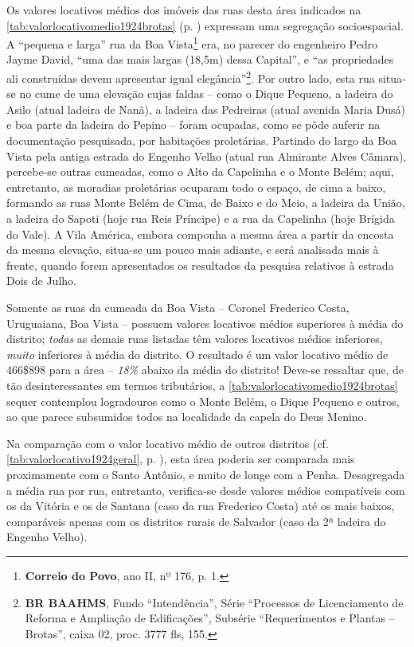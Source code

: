 Os valores locativos médios dos imóveis das ruas desta área indicados na \autoref{tab:valorlocativomedio1924brotas} (p. \pageref{tab:valorlocativomedio1924brotas}) expressam uma segregação socioespacial. A ``pequena e larga'' rua da Boa Vista\footnote{\textbf{Correio do Povo}, ano II, nº 176, p. 1.} era, no parecer do engenheiro Pedro Jayme David, ``uma das mais largas (18,5m) dessa Capital'', e ``as propriedades ali construídas devem apresentar igual elegância''\footnote{\textbf{BR BAAHMS}, Fundo ``Intendência'', Série ``Processos de Licenciamento de Reforma e Ampliação de Edificações'', Subsérie ``Requerimentos e Plantas -- Brotas'', caixa 02, proc. 3777 fls, 155.}. Por outro lado, esta rua situa-se no cume de uma elevação cujas faldas -- como o Dique Pequeno, a ladeira do Asilo (atual ladeira de Nanã), a ladeira das Pedreiras (atual avenida Maria Dusá) e boa parte da ladeira do Pepino --  foram ocupadas, como se pôde auferir na documentação pesquisada, por habitações proletárias. Partindo do largo da Boa Vista pela antiga estrada do Engenho Velho (atual rua Almirante Alves Câmara), percebe-se outras cumeadas, como o Alto da Capelinha e o Monte Belém; aqui, entretanto, as moradias proletárias ocuparam todo o espaço, de cima a baixo, formando as ruas Monte Belém de Cima, de Baixo e do Meio, a ladeira da União, a ladeira do Sapoti (hoje rua Reis Príncipe) e a rua da Capelinha (hoje Brígida do Vale). A Vila América, embora componha a mesma área a partir da encosta da mesma elevação, situa-se um pouco mais adiante, e será analisada mais à frente, quando forem apresentados os resultados da pesquisa relativos à estrada Dois de Julho. 

Somente as ruas da cumeada da Boa Vista -- Coronel Frederico Costa, Uruguaiana, Boa Vista -- possuem valores locativos médios superiores à média do distrito; \textit{todas} as demais ruas listadas têm valores locativos médios inferiores, \textit{muito} inferiores à média do distrito. O resultado é um valor locativo médio de 466\$898 para a área -- \textit{18\%} abaixo da média do distrito! Deve-se ressaltar que, de tão desinteressantes em termos tributários, a \autoref{tab:valorlocativomedio1924brotas} sequer contemplou logradouros como o Monte Belém, o Dique Pequeno e outros, ao que parece subsumidos todos na localidade da capela do Deus Menino.

Na comparação com o valor locativo médio de outros distritos (cf. \autoref{tab:valorlocativo1924geral}, p. \pageref{tab:valorlocativo1924geral}), esta área poderia ser comparada mais proximamente com o Santo Antônio, e muito de longe com a Penha. Desagregada a média rua por rua, entretanto, verifica-se desde valores médios compatíveis com os da Vitória e os de Santana (caso da rua Frederico Costa) até os mais baixos, comparáveis apenas com os distritos rurais de Salvador (caso da 2ª ladeira do Engenho Velho).

